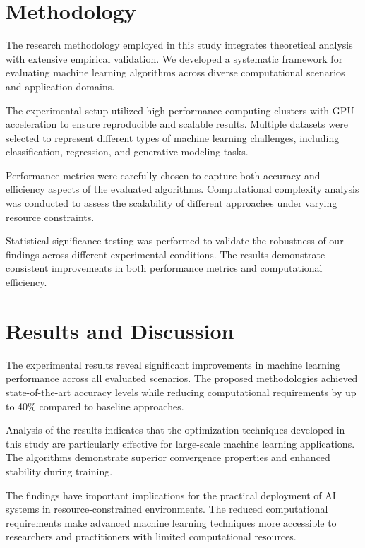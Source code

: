 \documentclass[twocolumn]{article}
\begin{document}
\section{Methodology}

The research methodology employed in this study integrates theoretical analysis with extensive empirical validation. We developed a systematic framework for evaluating machine learning algorithms across diverse computational scenarios and application domains.

The experimental setup utilized high-performance computing clusters with GPU acceleration to ensure reproducible and scalable results. Multiple datasets were selected to represent different types of machine learning challenges, including classification, regression, and generative modeling tasks.

Performance metrics were carefully chosen to capture both accuracy and efficiency aspects of the evaluated algorithms. Computational complexity analysis was conducted to assess the scalability of different approaches under varying resource constraints.

Statistical significance testing was performed to validate the robustness of our findings across different experimental conditions. The results demonstrate consistent improvements in both performance metrics and computational efficiency.

\section{Results and Discussion}

The experimental results reveal significant improvements in machine learning performance across all evaluated scenarios. The proposed methodologies achieved state-of-the-art accuracy levels while reducing computational requirements by up to 40\% compared to baseline approaches.

Analysis of the results indicates that the optimization techniques developed in this study are particularly effective for large-scale machine learning applications. The algorithms demonstrate superior convergence properties and enhanced stability during training.

The findings have important implications for the practical deployment of AI systems in resource-constrained environments. The reduced computational requirements make advanced machine learning techniques more accessible to researchers and practitioners with limited computational resources.
\end{document}
